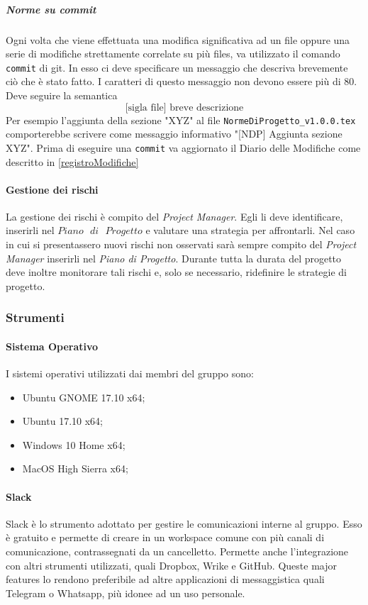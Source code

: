 			\subparagraph{Norme su commit}\Spazio
			Ogni volta che viene effettuata una modifica significativa ad un file oppure una serie di modifiche strettamente correlate su più files, va utilizzato il comando \texttt{commit} di git. In esso ci deve specificare un messaggio che descriva brevemente ciò che è stato fatto. I caratteri di questo messaggio non devono essere più di 80. Deve seguire la semantica
			$$\text{[sigla file] breve descrizione}$$
			Per esempio l'aggiunta della sezione "XYZ" al file \texttt{NormeDiProgetto\_v1.0.0.tex} comporterebbe scrivere come messaggio informativo "[NDP] Aggiunta sezione XYZ". Prima di eseguire una \texttt{commit} va aggiornato il Diario delle Modifiche come descritto in \ref{registroModifiche}
			
		\paragraph{Gestione dei rischi} \Spazio
		La gestione dei rischi è compito del \emph{Project Manager}. Egli li deve identificare, inserirli nel $Piano\text{ }di\text{ }Progetto$ e valutare una strategia per affrontarli. Nel caso in cui si presentassero nuovi rischi non osservati sarà sempre compito del \emph{Project Manager} inserirli nel \emph{Piano di Progetto}. Durante tutta la durata del progetto deve inoltre monitorare tali rischi e, solo se necessario, ridefinire le strategie di progetto.
		
	\subsubsection{Strumenti}
		\paragraph{Sistema Operativo} \Spazio
		I sistemi operativi utilizzati dai membri del gruppo sono:
		\begin{itemize}
			\item Ubuntu GNOME 17.10 x64;
			\item Ubuntu 17.10 x64;
			\item Windows 10 Home x64;
			\item MacOS High Sierra x64;
		\end{itemize}
		
		\paragraph{Slack}\Spazio
		Slack è lo strumento adottato per gestire le comunicazioni interne al gruppo. Esso è gratuito e permette di creare in un workspace comune con più canali di comunicazione, contrassegnati da un cancelletto. Permette anche l'integrazione con altri strumenti utilizzati, quali Dropbox, Wrike e GitHub. Queste major features lo rendono preferibile ad altre applicazioni di messaggistica quali Telegram o Whatsapp, più idonee ad un uso personale. 
		
